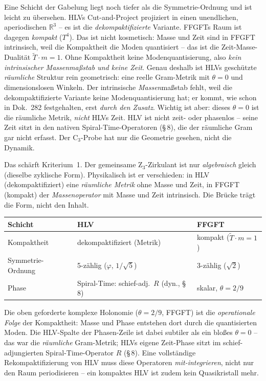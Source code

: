 Eine Schicht der Gabelung liegt noch tiefer als die Symmetrie-Ordnung und ist
leicht zu übersehen. HLVs Cut-and-Project projiziert in einen unendlichen,
aperiodischen $\mathbb{R}^3$ -- es ist die \emph{dekompaktifizierte} Variante.
FFGFTs Raum ist dagegen \emph{kompakt} ($T^4$). Das ist nicht kosmetisch: Masse
und Zeit sind in FFGFT intrinsisch, weil die Kompaktheit die Moden quantisiert --
das ist die Zeit-Masse-Dualität $\tilde T\cdot m=1$. Ohne Kompaktheit keine
Modenquantisierung, also \emph{kein intrinsischer Massenmaßstab und keine Zeit}.
Genau deshalb ist HLVs geschützte \emph{räumliche} Struktur rein geometrisch: eine
reelle Gram-Metrik mit $\theta=0$ und dimensionslosen Winkeln. Der intrinsische
\emph{Massen}maßstab fehlt, weil die dekompaktifizierte Variante keine
Modenquantisierung hat; er kommt, wie schon in Dok.~282 festgehalten, erst
\emph{durch den Zusatz}. Wichtig ist aber: dieses $\theta=0$ ist die räumliche
Metrik, \emph{nicht} HLVs Zeit. HLV ist nicht zeit- oder phasenlos -- seine Zeit
sitzt in den nativen Spiral-Time-Operatoren (§\,8), die der räumliche Gram gar nicht
erfasst. Der C$_3$-Probe hat nur die Geometrie gesehen, nicht die Dynamik.

Das schärft Kriterium~1. Der gemeinsame Z$_3$-Zirkulant ist nur \emph{algebraisch}
gleich (dieselbe zyklische Form). Physikalisch ist er verschieden: in HLV
(dekompaktifiziert) eine \emph{räumliche Metrik} ohne Masse und Zeit, in FFGFT
(kompakt) der \emph{Massenoperator} mit Masse und Zeit intrinsisch. Die Brücke
trägt die Form, nicht den Inhalt.

\begin{keyresult}
\begin{center}
\begin{tabular}{lll}
\toprule
Schicht & HLV & FFGFT \\
\midrule
Kompaktheit & dekompaktifiziert (Metrik) & kompakt ($\tilde T\!\cdot\! m=1$) \\
Symmetrie-Ordnung & 5-zählig ($\varphi$, $1/\sqrt5$) & 3-zählig ($\sqrt2$) \\
Phase & Spiral-Time: schief-adj.\ $R$ (dyn., §\,8) & skalar, $\theta=2/9$ \\
\bottomrule
\end{tabular}
\end{center}
Die oben geforderte komplexe Holonomie ($\theta=2/9$, FFGFT) ist die
\emph{operationale Folge} der Kompaktheit: Masse und Phase entstehen dort durch die
quantisierten Moden. Die HLV-Spalte der Phasen-Zeile ist dabei subtiler als ein
bloßes $\theta=0$ -- das war die \emph{räumliche} Gram-Metrik; HLVs eigene
Zeit-Phase sitzt im schief-adjungierten Spiral-Time-Operator $R$ (§\,8). Eine
vollständige Rekompaktifizierung von HLV muss diese Operatoren \emph{mit-integrieren},
nicht nur den Raum periodisieren -- ein kompaktes HLV ist zudem kein Quasikristall mehr.
\end{keyresult}

